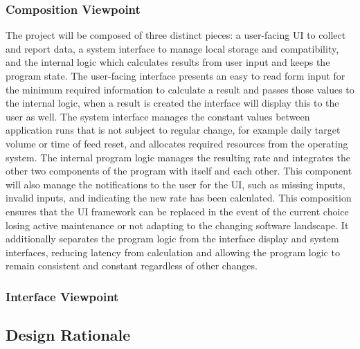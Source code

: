 \documentclass[onecolumn, draftclsnofoot,10pt, compsoc]{IEEEtran}
\begin{document}
\subsubsection{Composition Viewpoint}
The project will be composed of three distinct pieces: a user-facing UI to collect and report data, a system interface to manage local storage and compatibility, and the internal logic which calculates results from user input and keeps the program state.
The user-facing interface presents an easy to read form input for the minimum required information to calculate a result and passes those values to the internal logic, when a result is created the interface will display this to the user as well.
The system interface manages the constant values between application runs that is not subject to regular change, for example daily target volume or time of feed reset, and allocates required resources from the operating system.
The internal program logic manages the resulting rate and integrates the other two components of the program with itself and each other.
This component will also manage the notifications to the user for the UI, such as missing inputs, invalid inputs, and indicating the new rate has been calculated.
This composition ensures that the UI framework can be replaced in the event of the current choice losing active maintenance or not adapting to the changing software landscape.
It additionally separates the program logic from the interface display and system interfaces, reducing latency from calculation and allowing the program logic to remain consistent and constant regardless of other changes.

\subsubsection{Interface Viewpoint}

\subsection{Design Rationale}
\end{document}
